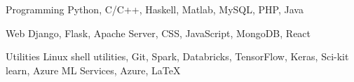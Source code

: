 
\vspace{-0.3cm}


\begin{cvskills}


  \cvskill
  {Programming}
  {Python, C/C++, Haskell, Matlab, MySQL, PHP, Java}


  \cvskill
  {Web}
  {Django, Flask, Apache Server, CSS, JavaScript, MongoDB, React }


  \cvskill
  {Utilities}
  {Linux shell utilities, Git, Spark, Databricks, TensorFlow, Keras,
    Sci-kit learn, Azure ML Services, Azure, \LaTeX}


\end{cvskills}

